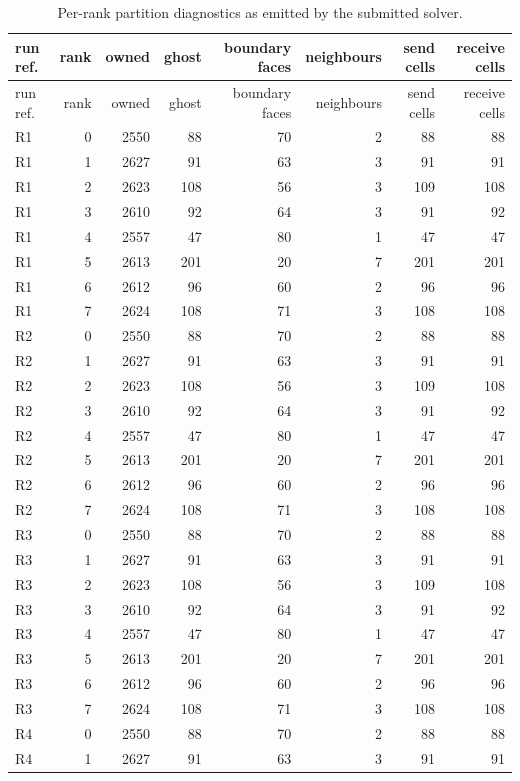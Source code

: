 \begin{longtable}{lrrrrrrr}
\caption{Per-rank partition diagnostics as emitted by the submitted solver.}\label{tab:partition-detail}\\
\toprule run ref. & rank & owned & ghost & boundary faces & neighbours & send cells & receive cells\\
\midrule
\endfirsthead
\toprule run ref. & rank & owned & ghost & boundary faces & neighbours & send cells & receive cells\\
\midrule
\endhead
R1 & 0 & 2550 & 88 & 70 & 2 & 88 & 88\\
R1 & 1 & 2627 & 91 & 63 & 3 & 91 & 91\\
R1 & 2 & 2623 & 108 & 56 & 3 & 109 & 108\\
R1 & 3 & 2610 & 92 & 64 & 3 & 91 & 92\\
R1 & 4 & 2557 & 47 & 80 & 1 & 47 & 47\\
R1 & 5 & 2613 & 201 & 20 & 7 & 201 & 201\\
R1 & 6 & 2612 & 96 & 60 & 2 & 96 & 96\\
R1 & 7 & 2624 & 108 & 71 & 3 & 108 & 108\\
R2 & 0 & 2550 & 88 & 70 & 2 & 88 & 88\\
R2 & 1 & 2627 & 91 & 63 & 3 & 91 & 91\\
R2 & 2 & 2623 & 108 & 56 & 3 & 109 & 108\\
R2 & 3 & 2610 & 92 & 64 & 3 & 91 & 92\\
R2 & 4 & 2557 & 47 & 80 & 1 & 47 & 47\\
R2 & 5 & 2613 & 201 & 20 & 7 & 201 & 201\\
R2 & 6 & 2612 & 96 & 60 & 2 & 96 & 96\\
R2 & 7 & 2624 & 108 & 71 & 3 & 108 & 108\\
R3 & 0 & 2550 & 88 & 70 & 2 & 88 & 88\\
R3 & 1 & 2627 & 91 & 63 & 3 & 91 & 91\\
R3 & 2 & 2623 & 108 & 56 & 3 & 109 & 108\\
R3 & 3 & 2610 & 92 & 64 & 3 & 91 & 92\\
R3 & 4 & 2557 & 47 & 80 & 1 & 47 & 47\\
R3 & 5 & 2613 & 201 & 20 & 7 & 201 & 201\\
R3 & 6 & 2612 & 96 & 60 & 2 & 96 & 96\\
R3 & 7 & 2624 & 108 & 71 & 3 & 108 & 108\\
R4 & 0 & 2550 & 88 & 70 & 2 & 88 & 88\\
R4 & 1 & 2627 & 91 & 63 & 3 & 91 & 91\\

\end{longtable}
